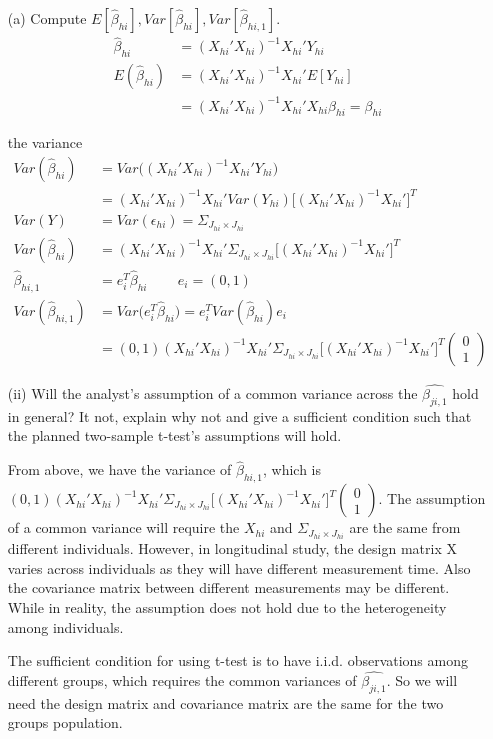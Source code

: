 \begin{itemize}[]
	
	\item[(a)] Compute $E[\hat{\beta}_{hi} ], Var[\hat{\beta}_{hi} ], Var[\hat{\beta}_{hi,1} ]$. 
\begin{align*}
		\hat{\beta}_{hi} &= (X_{hi}' X_{hi})^{-1} X_{hi}' Y_{hi} \\
	E(\hat{\beta}_{hi}) &= (X_{hi}' X_{hi})^{-1} X_{hi}' E[Y_{hi}] \\
	& =  (X_{hi}' X_{hi})^{-1} X_{hi}' X_{hi} \beta_{hi} =\beta_{hi} 
\end{align*}	

the variance 
\begin{align*}
	Var(\hat{\beta}_{hi}) &= Var \Big((X_{hi}' X_{hi})^{-1} X_{hi}' Y_{hi} \Big) \\
	&= (X_{hi}' X_{hi})^{-1} X_{hi}' Var(Y_{hi}) \Big[ (X_{hi}' X_{hi})^{-1} X_{hi}' \Big]^T \\
	Var(Y) &= Var(\epsilon_{hi})= \Sigma_{J_{hi} \times J_{hi}}\\
	Var(\hat{\beta}_{hi})  & =  (X_{hi}' X_{hi})^{-1} X_{hi}' \Sigma_{J_{hi} \times J_{hi}} \Big[ (X_{hi}' X_{hi})^{-1} X_{hi}' \Big]^T \\
	\hat{\beta}_{hi,1} &= e_i^T \hat{\beta}_{hi} \, \qquad e_i = (0,1)\\
	Var(\hat{\beta}_{hi,1}) &= Var \Big(e_i^T \hat{\beta}_{hi} \Big) = e_i^T  Var(\hat{\beta}_{hi}) e_i\\
&= (0,1) (X_{hi}' X_{hi})^{-1} X_{hi}' \Sigma_{J_{hi} \times J_{hi}} \Big[ (X_{hi}' X_{hi})^{-1} X_{hi}' \Big]^T  \begin{pmatrix}
	0 \\
	1
\end{pmatrix} 
\end{align*}		

\item[(ii)] Will the analyst's assumption of a common variance across the $\hat{\beta_{ji,1}}$ hold in general? It not, explain why not and give a sufficient condition such that the planned two-sample t-test's assumptions will hold.

From above, we have the variance of $\hat{\beta}_{hi,1}$, which is $(0,1) (X_{hi}' X_{hi})^{-1} X_{hi}' \Sigma_{J_{hi} \times J_{hi}} \Big[ (X_{hi}' X_{hi})^{-1} X_{hi}' \Big]^T  \begin{pmatrix}
	0 \\
	1
\end{pmatrix} $. 
The assumption of a common variance will require the $X_{hi}$ and $\Sigma_{J_{hi} \times J_{hi}} $ are the same from different individuals. However, in longitudinal study, the design matrix X varies across individuals as they will have different measurement time. Also the covariance matrix between different measurements may be different. While in reality, the assumption does not hold due to the heterogeneity among individuals.

The sufficient condition for using t-test is to have i.i.d. observations among different groups, which requires the common variances of $\hat{\beta_{ji,1}}$. So we will need the design matrix and covariance matrix are the same for the two groups population. 

\end{itemize}

